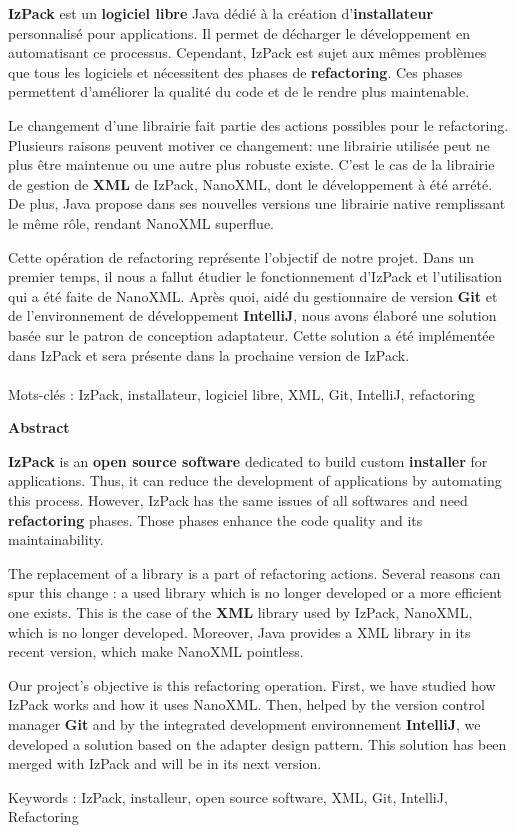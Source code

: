 \textbf{IzPack} est un \textbf{logiciel libre} Java dédié à la création d'\textbf{installateur} personnalisé pour applications.
Il permet de décharger le développement en automatisant ce processus.
Cependant, IzPack est sujet aux mêmes problèmes que tous les logiciels et nécessitent des phases de \textbf{refactoring}.
Ces phases permettent d'améliorer la qualité du code et de le rendre plus maintenable.

Le changement d'une librairie fait partie des actions possibles pour le refactoring.
Plusieurs raisons peuvent motiver ce changement: une librairie utilisée peut ne plus être maintenue ou une autre plus robuste existe.
C'est le cas de la librairie de gestion de \textbf{XML} de IzPack, NanoXML, dont le développement à été arrété.
De plus, Java propose dans ses nouvelles versions une librairie native remplissant le même rôle, rendant NanoXML superflue.

Cette opération de refactoring représente l'objectif de notre projet.
Dans un premier temps, il nous a fallut étudier le fonctionnement d'IzPack et l'utilisation qui a été faite de NanoXML.
Après quoi, aidé du gestionnaire de version \textbf{Git} et de l'environnement de développement \textbf{IntelliJ}, nous avons élaboré une solution basée sur le patron de conception adaptateur.
Cette solution a été implémentée dans IzPack et sera présente dans la prochaine version de IzPack.
~\\
~\\
Mots-clés : IzPack, installateur, logiciel libre, XML, Git, IntelliJ, refactoring
\vfill
\begin{center}\large{\textbf{Abstract}}\end{center}

\textbf{IzPack} is an \textbf{open source software} dedicated to build custom \textbf{installer} for applications.
Thus, it can reduce the development of applications by automating this process.
However, IzPack has the same issues of all softwares and need \textbf{refactoring} phases.
Those phases enhance the code quality and its maintainability.

The replacement of a library is a part of refactoring actions.
Several reasons can spur this change : a used library which is no longer developed or a more efficient one exists.
This is the case of the \textbf{XML} library used by IzPack, NanoXML, which is no longer developed.
Moreover, Java provides a XML library in its recent version, which make NanoXML pointless.

Our project's objective is this refactoring operation.
First, we have studied how IzPack works and how it uses NanoXML.
Then, helped by the version control manager \textbf{Git} and by the integrated development environnement \textbf{IntelliJ}, we developed a solution based on the adapter design pattern.
This solution has been merged with IzPack and will be in its next version.

Keywords : IzPack, installeur, open source software, XML, Git, IntelliJ, Refactoring